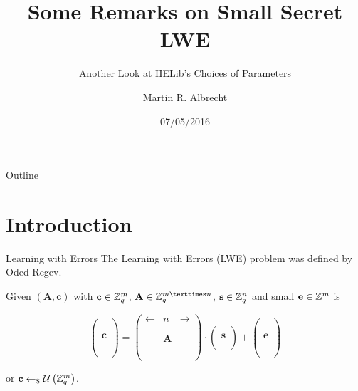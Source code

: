 \documentclass[presentation,smaller]{beamer}
\author{Martin R. Albrecht}
\date{07/05/2016}
\title{Some Remarks on Small Secret LWE}
\subtitle{Another Look at HELib’s Choices of Parameters}
\newcommand{\ZZ}[1][blank]{\ensuremath{\ifthenelse{\equal{#1}{blank}}{\mathbb{Z}}{\mathbb{Z}\left[#1\right]}\xspace}}
\newcommand{\ZZq}[1][blank]{\ensuremath{\ifthenelse{\equal{#1}{blank}}{\mathbb{Z}_q}{\mathbb{Z}_q\left[#1\right]}\xspace}}
\renewcommand{\U}[1]{\ensuremath{\mathcal{U}\left( {#1} \right)}\xspace}
\renewcommand{\vec}[1]{\ensuremath{\mathbf{#1}}\xspace}
\newcommand{\sample}{\ensuremath{\leftarrow_{\$}}}
\begin{document}
\maketitle
\begin{frame}{Outline}
\tableofcontents
\end{frame}


\section{Introduction}
\label{sec:orgf852ad9}
\begin{frame}[label={sec:orgda64a9a}]{Learning with Errors}
The Learning with Errors (LWE) problem was deﬁned by Oded Regev.

Given \((\vec{A},\vec{c})\) with \(\vec{c} \in \ZZq^{m}\), \(\vec{A} \in \ZZq^{m × n}\), \(\vec{s} \in \ZZq^{n}\) and small \(\vec{e} \in \ZZ^{m}\) is

\[
\left(\begin{array}{c}
\\
\\
\\ 
\vec{c} \\
\\
\\
\\
\end{array} \right) = \left(
\begin{array}{ccc}
\leftarrow & n & \rightarrow \\
\\
\\ 
& \vec{A} & \\
\\
\\
\\
\end{array} \right) \cdot \left( \begin{array}{c}
\\
\vec{s} \\
\\
\end{array} \right) + \left(
\begin{array}{c}
\\
\\
\\ 
\vec{e} \\
\\
\\
\\
\end{array} 
\right)
\]

or \(\vec{c} \sample \U{\ZZq^{m}}\).
\end{frame}
\end{document}
